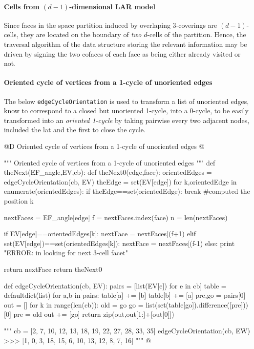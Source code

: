 \documentclass[11pt,oneside]{article}    %
\begin{document}
\paragraph{Cells from $(d-1)$-dimensional LAR model}
Since faces in the space partition induced by overlaping 3-coverings are $(d-1)$-cells, they are located on the boundary of \emph{two} $d$-cells of the partition. Hence, the traversal algorithm of the data structure storing the relevant information may be driven by signing the two cofaces of each face as being either already visited or not.


\paragraph{Oriented cycle of vertices from a 1-cycle of unoriented edges}
The below \texttt{edgeCycleOrientation} is used to transform a list of unoriented edges, know to correspond to a closed but unoriented 1-cycle, into a 0-cycle, to be easily transformed into an \emph{oriented 1-cycle} by taking pairwise every two adjacent nodes, included the lat and the first to close the cycle.

@D Oriented cycle of vertices from a 1-cycle of unoriented edges
@{""" Oriented cycle of vertices from a 1-cycle of unoriented edges """
def theNext(EF_angle,EV,cb):
    def theNext0(edge,face):
        orientedEdges = edgeCycleOrientation(cb, EV)
        theEdge = set(EV[edge])
        for k,orientedEdge in enumerate(orientedEdges):
            if theEdge==set(orientedEdge): break   #computed the position k
    
        nextFaces = EF_angle[edge]
        f = nextFaces.index(face)
        n = len(nextFaces)
        
        if EV[edge]==orientedEdges[k]:
            nextFace = nextFaces[(f+1)%
        elif set(EV[edge])==set(orientedEdges[k]):
            nextFace = nextFaces[(f-1)%
        else: print "ERROR: in looking for next 3-cell facet"
            
        return nextFace
    return theNext0

def edgeCycleOrientation(cb, EV):
    pairs = [list(EV[e]) for e in cb]
    table = defaultdict(list)
    for a,b in pairs:
        table[a] += [b]
        table[b] += [a]
    pre,go = pairs[0]
    out = []
    for k in range(len(cb)):
        old = go
        go = list(set(table[go]).difference([pre]))[0]
        pre = old
        out += [go]
    return zip(out,out[1:]+[out[0]])

"""
cb = [2, 7, 10, 12, 13, 18, 19, 22, 27, 28, 33, 35]
edgeCycleOrientation(cb, EW) 
>>>    [1, 0, 3, 18, 15, 6, 10, 13, 12, 8, 7, 16]
"""
@}
\end{document}
